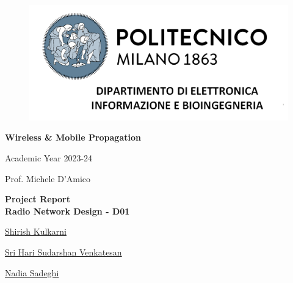 \begin{titlepage}
    
    \begin{figure}[htp]
    \centering
    \includegraphics[scale=0.4]{Images/deib.png}
    \end{figure}
    \begin{center}
    \vspace{10pt}
    {\fontsize{26}{2}\selectfont \textbf{Wireless \& Mobile Propagation}}
    \\\vspace{10pt}

    {\fontsize{16}{0}\selectfont Academic Year 2023-24}
    \\\vspace{45pt}

    {\fontsize{20}{0}\selectfont Prof. Michele D'Amico}
    \\\vspace{45pt}
    
    {\fontsize{28}{2}\selectfont \textbf{Project Report \\\vspace{24pt} Radio Network Design - D01}}
    \\\vspace{45pt}
    
    {\fontsize{18}{0} \selectfont \href{mailto:shirish.kulkarni@mail.polimi.it}{Shirish Kulkarni}}
    \\\vspace{18pt}
    
    {\fontsize{18}{0}\selectfont \href{mailto: srihari.venkatesan@mail.polimi.it}{Sri Hari Sudarshan Venkatesan}}
    \\\vspace{20pt}

    {\fontsize{18}{0}\selectfont \href{mailto: nadia.sadeghi@mail.polimi.it}{Nadia Sadeghi}}
    \\\vspace{20pt}

    \end{center}
\end{titlepage}

